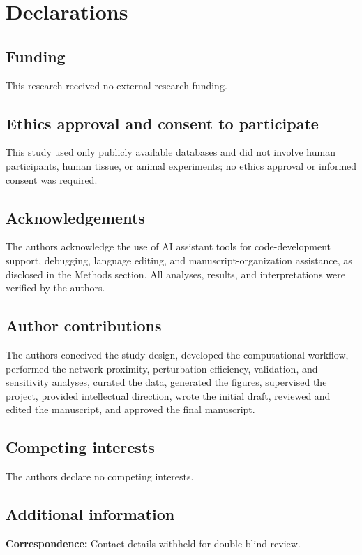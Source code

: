 \section*{Declarations}

\subsection*{Funding}

This research received no external research funding.

\subsection*{Ethics approval and consent to participate}

This study used only publicly available databases and did not involve human participants, human tissue, or animal experiments; no ethics approval or informed consent was required.

\subsection*{Acknowledgements}

The authors acknowledge the use of AI assistant tools for code-development support, debugging, language editing, and manuscript-organization assistance, as disclosed in the Methods section. All analyses, results, and interpretations were verified by the authors.

\subsection*{Author contributions}

The authors conceived the study design, developed the computational workflow, performed the network-proximity, perturbation-efficiency, validation, and sensitivity analyses, curated the data, generated the figures, supervised the project, provided intellectual direction, wrote the initial draft, reviewed and edited the manuscript, and approved the final manuscript.

\subsection*{Competing interests}

The authors declare no competing interests.

\subsection*{Additional information}

\noindent\textbf{Correspondence:} Contact details withheld for double-blind review.
